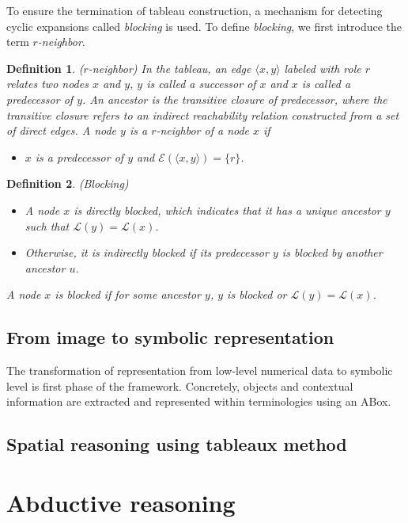 \documentclass{article}
\newtheorem{mydef}{Definition}
\begin{document}
To ensure the termination of tableau construction, a mechanism for detecting cyclic expansions called \textit{blocking} is used.
To define \textit{blocking}, we first introduce the term \textit{$r$-neighbor}.
\begin{mydef}($r$-neighbor)
In the tableau, an edge $\langle x,y \rangle$ labeled with role $r$ relates two nodes $x$ and $y$,
$y$ is called a successor of $x$ and $x$ is called  a predecessor of $y$. An ancestor is the transitive closure of predecessor,
where the transitive closure refers to an indirect reachability relation constructed from a set of direct edges.
A node $y$ is a $r$-neighbor of a node $x$ if
\begin{itemize}
\item $x$ is a predecessor of $y$ and $\mathcal{E}(\langle x,y\rangle)=\{r\}$.
\end{itemize}
\end{mydef}


\begin{mydef}(Blocking)

\begin{itemize}
\item A node $x$ is directly blocked, which indicates that it has a unique ancestor $y$ such that $\mathcal{L}(y)=\mathcal{L}(x)$.
\item  Otherwise, it is indirectly blocked if its predecessor $y$ is blocked by another ancestor $u$.
\end{itemize}
A node $x$ is blocked if for some ancestor $y$, $y$ is blocked or $\mathcal{L}(y)=\mathcal{L}(x)$. 
\end{mydef}

\subsection{From image to symbolic representation}
The transformation of representation from low-level numerical data to symbolic level is first phase of the framework.
Concretely, objects and contextual information are extracted and represented within terminologies using an ABox.

\subsection{Spatial reasoning using tableaux method}

\section{Abductive reasoning}\label{sec:abd}
\end{document}

